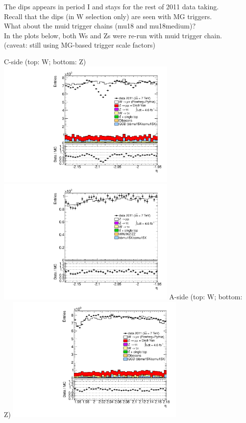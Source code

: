  {
 The dips appears in period I and stays for the rest of 2011 data taking. \\
 Recall that the dips (in W selection only) are seen with MG triggers. \\
 What about the muid trigger chains (mu18 and mu18medium)? \\
 In the plots below, both Ws and Zs were re-run with muid trigger chain. \\
 (caveat: still using MG-based trigger scale factors)
}

 {
\colb[T]
C-side (top: W; bottom: Z)
\centering
\includegraphics[width=0.66\textwidth]{dates/20130306/figures/mu18/WMU18_MG_10_C_stack_l_eta_NEG} \\
\includegraphics[width=0.66\textwidth]{dates/20130306/figures/mu18/ZMU18_MG_10_C_stack_lN_eta_ALL.pdf}
A-side (top: W; bottom: Z)
\centering
\includegraphics[width=0.66\textwidth]{dates/20130306/figures/mu18/WMU18_MG_10_A_stack_l_eta_NEG} \\
}
